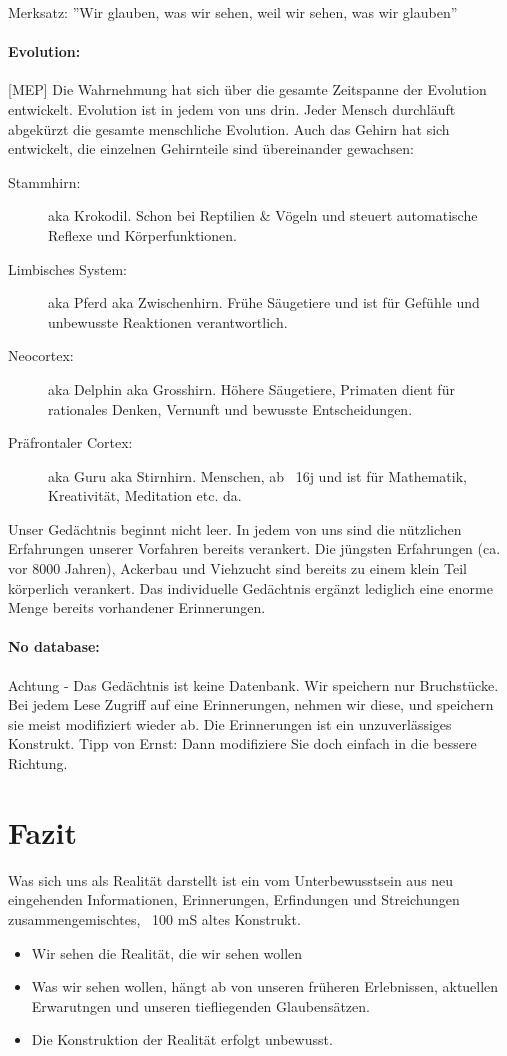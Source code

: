 Merksatz: ''Wir glauben, was wir sehen, weil wir sehen, was wir glauben''

\paragraph{Evolution:} [MEP] Die Wahrnehmung hat sich über die gesamte Zeitspanne der Evolution entwickelt. Evolution ist in jedem von uns drin. Jeder Mensch durchläuft abgekürzt die gesamte menschliche Evolution. Auch das Gehirn hat sich entwickelt, die einzelnen Gehirnteile sind übereinander gewachsen:

\begin{description}
	\item[Stammhirn:] aka Krokodil. Schon bei Reptilien \& Vögeln und steuert automatische Reflexe und Körperfunktionen.
	\item[Limbisches System:] aka Pferd aka Zwischenhirn. Frühe Säugetiere und ist für Gefühle und unbewusste Reaktionen verantwortlich.
	\item[Neocortex:] aka Delphin aka Grosshirn. Höhere Säugetiere, Primaten dient für rationales Denken, Vernunft und bewusste Entscheidungen.
	\item[Präfrontaler Cortex:] aka Guru aka Stirnhirn. Menschen, ab ~16j und ist für Mathematik, Kreativität, Meditation etc. da.
\end{description}

Unser Gedächtnis beginnt nicht leer. In jedem von uns sind die nützlichen Erfahrungen unserer Vorfahren bereits verankert. Die jüngsten Erfahrungen (ca. vor 8000 Jahren), Ackerbau und Viehzucht sind bereits zu einem klein Teil körperlich verankert. Das individuelle Gedächtnis ergänzt lediglich eine enorme Menge bereits vorhandener Erinnerungen.

\paragraph{No database:}
Achtung - Das Gedächtnis ist keine Datenbank. Wir speichern nur Bruchstücke. Bei jedem Lese Zugriff auf eine Erinnerungen, nehmen wir diese, und speichern sie meist modifiziert wieder ab. Die Erinnerungen ist ein unzuverlässiges Konstrukt. Tipp von Ernst: Dann modifiziere Sie doch einfach in die bessere Richtung.

\section{Fazit}
Was sich uns als Realität darstellt ist ein vom Unterbewusstsein aus neu eingehenden Informationen, Erinnerungen, Erfindungen und Streichungen
zusammengemischtes, ~100 mS altes Konstrukt.
\begin{itemize}
	\item Wir sehen die Realität, die wir sehen wollen
	\item Was wir sehen wollen, hängt ab von unseren früheren Erlebnissen, aktuellen Erwarutngen und unseren tiefliegenden Glaubensätzen.
	\item Die Konstruktion der Realität erfolgt unbewusst.
\end{itemize}

